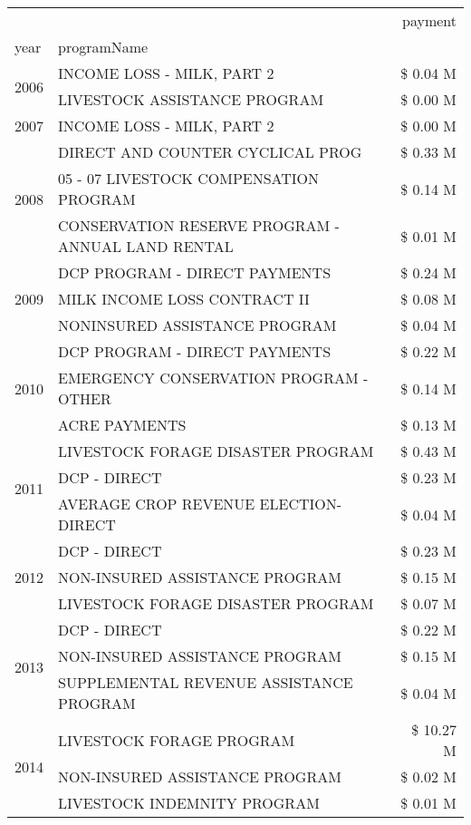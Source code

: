\begin{tabular}{llr}
\toprule
 &  & payment \\
year & programName &  \\
\midrule
\multirow[t]{2}{*}{2006} & INCOME LOSS - MILK, PART 2 & \$ 0.04 M \\
 & LIVESTOCK ASSISTANCE PROGRAM & \$ 0.00 M \\
\cline{1-3}
2007 & INCOME LOSS - MILK, PART 2 & \$ 0.00 M \\
\cline{1-3}
\multirow[t]{3}{*}{2008} & DIRECT AND COUNTER CYCLICAL PROG & \$ 0.33 M \\
 & 05 - 07 LIVESTOCK COMPENSATION PROGRAM & \$ 0.14 M \\
 & CONSERVATION RESERVE PROGRAM - ANNUAL LAND RENTAL & \$ 0.01 M \\
\cline{1-3}
\multirow[t]{3}{*}{2009} & DCP PROGRAM - DIRECT PAYMENTS & \$ 0.24 M \\
 & MILK INCOME LOSS CONTRACT II & \$ 0.08 M \\
 & NONINSURED ASSISTANCE PROGRAM & \$ 0.04 M \\
\cline{1-3}
\multirow[t]{3}{*}{2010} & DCP PROGRAM - DIRECT PAYMENTS & \$ 0.22 M \\
 & EMERGENCY CONSERVATION PROGRAM - OTHER & \$ 0.14 M \\
 & ACRE PAYMENTS & \$ 0.13 M \\
\cline{1-3}
\multirow[t]{3}{*}{2011} & LIVESTOCK FORAGE DISASTER PROGRAM & \$ 0.43 M \\
 & DCP - DIRECT & \$ 0.23 M \\
 & AVERAGE CROP REVENUE ELECTION-DIRECT & \$ 0.04 M \\
\cline{1-3}
\multirow[t]{3}{*}{2012} & DCP - DIRECT & \$ 0.23 M \\
 & NON-INSURED ASSISTANCE PROGRAM & \$ 0.15 M \\
 & LIVESTOCK FORAGE DISASTER PROGRAM & \$ 0.07 M \\
\cline{1-3}
\multirow[t]{3}{*}{2013} & DCP - DIRECT & \$ 0.22 M \\
 & NON-INSURED ASSISTANCE PROGRAM & \$ 0.15 M \\
 & SUPPLEMENTAL REVENUE ASSISTANCE PROGRAM & \$ 0.04 M \\
\cline{1-3}
\multirow[t]{3}{*}{2014} & LIVESTOCK FORAGE PROGRAM & \$ 10.27 M \\
 & NON-INSURED ASSISTANCE PROGRAM & \$ 0.02 M \\
 & LIVESTOCK INDEMNITY PROGRAM & \$ 0.01 M \\
\cline{1-3}

\end{tabular}

